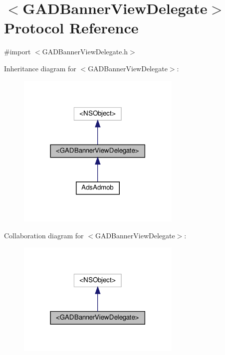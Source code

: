 \hypertarget{protocolGADBannerViewDelegate-p}{}\section{$<$G\+A\+D\+Banner\+View\+Delegate$>$ Protocol Reference}
\label{protocolGADBannerViewDelegate-p}


{\ttfamily \#import $<$G\+A\+D\+Banner\+View\+Delegate.\+h$>$}



Inheritance diagram for $<$G\+A\+D\+Banner\+View\+Delegate$>$\+:
\nopagebreak
\begin{figure}[H]
\begin{center}
\leavevmode
\includegraphics[width=222pt]{protocolGADBannerViewDelegate-p__inherit__graph}
\end{center}
\end{figure}


Collaboration diagram for $<$G\+A\+D\+Banner\+View\+Delegate$>$\+:
\nopagebreak
\begin{figure}[H]
\begin{center}
\leavevmode
\includegraphics[width=222pt]{protocolGADBannerViewDelegate-p__coll__graph}
\end{center}
\end{figure}
